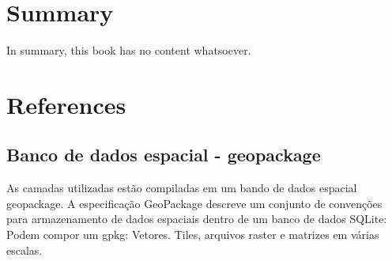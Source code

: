 \documentclass[
  letterpaper,
]{report}
\newlength{\cslhangindent}
\newlength{\cslentryspacingunit} %
\newenvironment{CSLReferences}[2] %
 {%
  \setlength{\parindent}{0pt}
  \ifodd #1
  \let\oldpar\par
  \def\par{\hangindent=\cslhangindent\oldpar}
  \fi
  \setlength{\parskip}{#2\cslentryspacingunit}
 }%
 {}
\begin{document}

\hypertarget{summary}{%
\chapter{Summary}\label{summary}}

In summary, this book has no content whatsoever.


\hypertarget{references}{%
\chapter*{References}\label{references}}


\hypertarget{refs}{}
\begin{CSLReferences}{0}{0}
\end{CSLReferences}

\hypertarget{banco-de-dados-espacial---geopackage}{%
\section*{Banco de dados espacial -
geopackage}\label{banco-de-dados-espacial---geopackage}}


As camadas utilizadas estão compiladas em um bando de dados espacial
geopackage. A especificação GeoPackage descreve um conjunto de
convenções para armazenamento de dados espaciais dentro de um banco de
dados SQLite: Podem compor um gpkg: Vetores. Tiles, arquivos raster e
matrizes em várias escalas.
\end{document}
